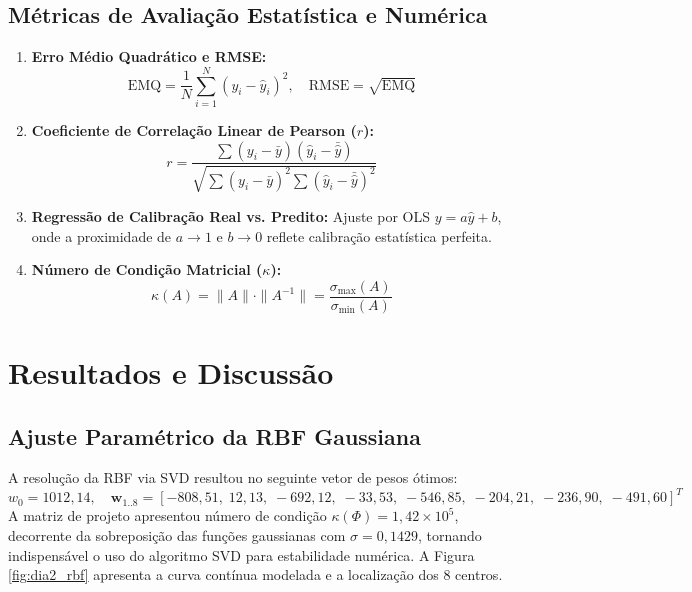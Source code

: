 \documentclass[12pt,a4paper]{article}
\begin{document}
\subsection{Métricas de Avaliação Estatística e Numérica}
\begin{enumerate}
    \item \textbf{Erro Médio Quadrático e RMSE:}
    \begin{equation}
    \text{EMQ} = \frac{1}{N} \sum_{i=1}^{N} (y_i - \hat{y}_i)^2, \quad \text{RMSE} = \sqrt{\text{EMQ}}
    \end{equation}
    \item \textbf{Coeficiente de Correlação Linear de Pearson ($r$):}
    \begin{equation}
    r = \frac{\sum (y_i - \bar{y})(\hat{y}_i - \bar{\hat{y}})}{\sqrt{\sum (y_i - \bar{y})^2 \sum (\hat{y}_i - \bar{\hat{y}})^2}}
    \end{equation}
    \item \textbf{Regressão de Calibração Real vs. Predito:} Ajuste por OLS $y = a\hat{y} + b$, onde a proximidade de $a \to 1$ e $b \to 0$ reflete calibração estatística perfeita.
    \item \textbf{Número de Condição Matricial ($\kappa$):}
    \begin{equation}
    \kappa(A) = \|A\| \cdot \|A^{-1}\| = \frac{\sigma_{\max}(A)}{\sigma_{\min}(A)}
    \end{equation}
\end{enumerate}

\section{Resultados e Discussão}

\subsection{Ajuste Paramétrico da RBF Gaussiana}
A resolução da RBF via SVD resultou no seguinte vetor de pesos ótimos:
\begin{equation}
w_0 = 1012{,}14, \quad \mathbf{w}_{1..8} = [-808{,}51, \; 12{,}13, \; -692{,}12, \; -33{,}53, \; -546{,}85, \; -204{,}21, \; -236{,}90, \; -491{,}60]^T
\end{equation}
A matriz de projeto apresentou número de condição $\kappa(\Phi) = 1{,}42 \times 10^5$, decorrente da sobreposição das funções gaussianas com $\sigma = 0{,}1429$, tornando indispensável o uso do algoritmo SVD para estabilidade numérica.
A Figura \ref{fig:dia2_rbf} apresenta a curva contínua modelada e a localização dos 8 centros.
\end{document}
